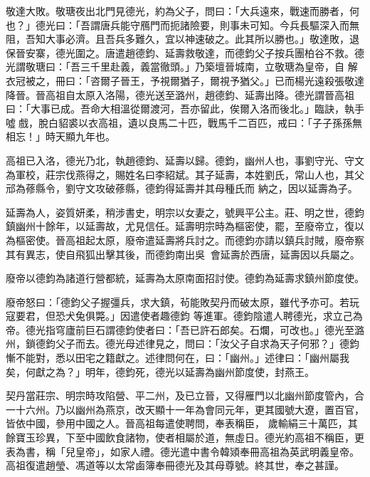 \begin{pinyinscope}
 敬達大敗。敬瑭夜出北門見德光，約為父子，問曰：「大兵遠來，戰速而勝者，何也？」德光曰：「吾謂唐兵能守鴈門而扼諸險要，則事未可知。今兵長驅深入而無阻，吾知大事必濟。且吾兵多難久，宜以神速破之。此其所以勝也。」敬達敗，退保晉安寨，德光圍之。唐遣趙德鈞、延壽救敬達，而德鈞父子按兵團柏谷不救。德光謂敬瑭曰：「吾三千里赴義，義當徹頭。」乃築壇晉城南，立敬瑭為皇帝，自
 解衣冠被之，冊曰：「咨爾子晉王，予視爾猶子，爾視予猶父。」已而楊光遠殺張敬達降晉。晉高祖自太原入洛陽，德光送至潞州，趙德鈞、延壽出降。德光謂晉高祖曰：「大事已成。吾命大相溫從爾渡河，吾亦留此，俟爾入洛而後北。」臨訣，執手噓戲，脫白貂裘以衣高祖，遺以良馬二十匹，戰馬千二百匹，戒曰：「子子孫孫無相忘！」時天顯九年也。



 高祖已入洛，德光乃北，執趙德鈞、延壽以歸。德鈞，幽州人也，事劉守光、守文為軍校，莊宗伐燕得之，賜姓名曰李紹斌。其子延壽，本姓劉氏，常山人也，其父邧為蓚縣令，劉守文攻破蓚縣，德鈞得延壽并其母種氏而
 納之，因以延壽為子。



 延壽為人，姿質妍柔，稍涉書史，明宗以女妻之，號興平公主。莊、明之世，德鈞鎮幽州十餘年，以延壽故，尤見信任。延壽明宗時為樞密使，罷，至廢帝立，復以為樞密使。晉高祖起太原，廢帝遣延壽將兵討之。而德鈞亦請以鎮兵討賊，廢帝察其有異志，使自飛狐出擊其後，而德鈞南出吳，會延壽於西唐，延壽因以兵屬之。



 廢帝以德鈞為諸道行營都統，延壽為太原南面招討使。德鈞為延壽求鎮州節度使。



 廢帝怒曰：「德鈞父子握彊兵，求大鎮，茍能敗契丹而破太原，雖代予亦可。若玩寇要君，但恐犬兔俱斃。」因遣使者趣德鈞
 等進軍。德鈞陰遣人聘德光，求立己為帝。德光指穹廬前巨石謂德鈞使者曰：「吾已許石郎矣。石爛，可改也。」德光至潞州，鎖德鈞父子而去。德光母述律見之，問曰：「汝父子自求為天子何邪？」德鈞慚不能對，悉以田宅之籍獻之。述律問何在，曰：「幽州。」述律曰：「幽州屬我矣，何獻之為？」明年，德鈞死，德光以延壽為幽州節度使，封燕王。



 契丹當莊宗、明宗時攻陷營、平二州，及已立晉，又得雁門以北幽州節度管內，合一十六州。乃以幽州為燕京，改天顯十一年為會同元年，更其國號大遼，置百官，皆依中國，參用中國之人。晉高祖每遣使聘問，奉表稱臣，
 歲輸絹三十萬匹，其餘寶玉珍異，下至中國飲食諸物，使者相屬於道，無虛日。德光約高祖不稱臣，更表為書，稱「兒皇帝」，如家人禮。德光遣中書令韓熲奉冊高祖為英武明義皇帝。高祖復遣趙瑩、馮道等以太常鹵簿奉冊德光及其母尊號。終其世，奉之甚謹。




\end{pinyinscope}
